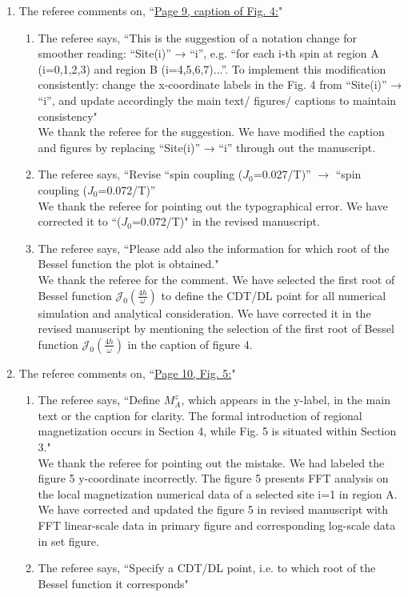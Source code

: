 \documentclass[10pt,
superscriptaddress,
amsmath,amssymb,showkeys,
aps, 
prb,
]{revtex4-2}
\newcommand{\response}[1]{{\color{black}#1}} %
\newcommand{\comment}[1]{{\color{blue}#1}} %
\begin{document}
\begin{enumerate}
\begin{enumerate}
		\item The referee comments on, \comment{``\underline{Page 9, caption of Fig. 4:}"}
		\begin{enumerate}
			\item The referee says, \comment{``This is the suggestion of a notation change for smoother reading: “Site(i)” → “i”, 
			e.g. “for each i-th spin at region A (i=0,1,2,3) and region B (i=4,5,6,7)...”. To implement this modification consistently: change the x-coordinate labels in the Fig. 4 from “Site(i)” → “i”, and update accordingly the main text/ figures/ captions to
			maintain consistency"}\\
		
			\response{We thank the referee for the suggestion. We have modified the caption and figures by replacing ``Site(i)” → ``i” through out the manuscript.}
			\item The referee says, \comment{``Revise “spin coupling ($J_0$=0.027/T)” $\rightarrow$ “spin coupling ($J_0$=0.072/T)”}\\
			
			\response{We thank the referee for pointing out the typographical error. We have corrected it to ``($J_0$=0.072/T)" in the revised manuscript.}\\
			\item The referee says, \comment{``Please add also the information for which root of the Bessel function the plot is obtained."}\\
			
			\response{We thank the referee for the comment. We have selected the first root of Bessel function $\mathcal{J}_0\left(\frac{4h}{\omega}\right)$ to define the CDT/DL point for all numerical simulation and analytical consideration. We have corrected it in the revised manuscript by mentioning the selection of the first root of Bessel function $\mathcal{J}_0\left(\frac{4h}{\omega}\right)$ in the caption of figure 4.}
		\end{enumerate}
		\item The referee comments on, \comment{``\underline{Page 10, Fig. 5:}"}
		\begin{enumerate}
			\item The referee says, \comment{``Define $M_A^z$, which appears in the y-label, in the main text or the caption for
			clarity. The formal introduction of regional magnetization occurs in Section 4, while Fig. 5 is situated within Section 3."}\\
		
			\response{We thank the referee for pointing out the mistake. We had labeled the figure 5 y-coordinate incorrectly. The figure 5 presents FFT analysis on the local magnetization numerical data of a selected site i=1 in region A. We have corrected and updated the figure 5 in revised manuscript with FFT linear-scale data in primary figure and corresponding log-scale data in set figure.}\\
			\item The referee says, \comment{``Specify a CDT/DL point, i.e. to which root of the Bessel function it corresponds"}\\
			

\end{enumerate}
\end{enumerate}
\end{enumerate}
\end{document}
